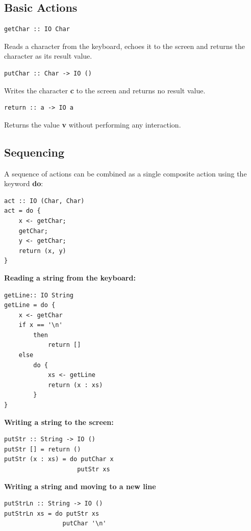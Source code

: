 \subsection{Basic Actions}
\begin{lstlisting}
getChar :: IO Char
\end{lstlisting}
Reads a character from the keyboard, echoes it to the screen and returns the character as its result value.
\begin{lstlisting}
putChar :: Char -> IO ()
\end{lstlisting}
Writes the character \textbf{c} to the screen and returns no result value.
\begin{lstlisting}
return :: a -> IO a
\end{lstlisting}
Returns the value \textbf{v} without performing any interaction.

\subsection{Sequencing}
A sequence of actions can be combined as a single composite action using the keyword \textbf{do}:
\begin{lstlisting}
act :: IO (Char, Char)
act = do {
    x <- getChar;
    getChar;
    y <- getChar;
    return (x, y)
}
\end{lstlisting}
\textbf{Reading a string from the keyboard:}
\begin{lstlisting}
getLine:: IO String 
getLine = do {
    x <- getChar
    if x == '\n' 
        then
            return []
    else
        do {
            xs <- getLine 
            return (x : xs)
        }
}
\end{lstlisting}
\textbf{Writing a string to the screen:}
\begin{lstlisting}
putStr :: String -> IO ()
putStr [] = return ()
putStr (x : xs) = do putChar x
                    putStr xs
\end{lstlisting}
\textbf{Writing a string and moving to a new line}
\begin{lstlisting}
putStrLn :: String -> IO ()
putStrLn xs = do putStr xs
                putChar '\n'
\end{lstlisting}